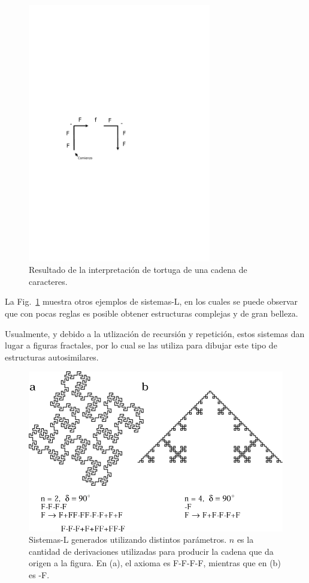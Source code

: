 \begin{figure}
\center
\includegraphics[width=8cm]{figures/tortuga}
\caption{Resultado de la interpretación de tortuga de una cadena de caracteres.}
\label{fg:tortuga}
\end{figure}

La Fig.~\ref{fg:tortuga} muestra otros ejemplos de sistemas-L, en los cuales se puede observar que con pocas reglas es posible obtener estructuras complejas y de gran belleza.

Usualmente, y debido a la utlización de recursión y repetición, estos sistemas dan lugar a figuras fractales, por lo cual se las utiliza para dibujar este tipo de estructuras autosimilares.

\begin{figure}
\center
\includegraphics[width=13cm]{figures/sistemasL}
\caption{Sistemas-L generados utilizando distintos parámetros. $n$ es la cantidad de derivaciones utilizadas para producir la cadena que da origen a la figura. En (a), el axioma es F-F-F-F, mientras que en (b) es -F.}
\label{fg:sistemasL}
\end{figure}

